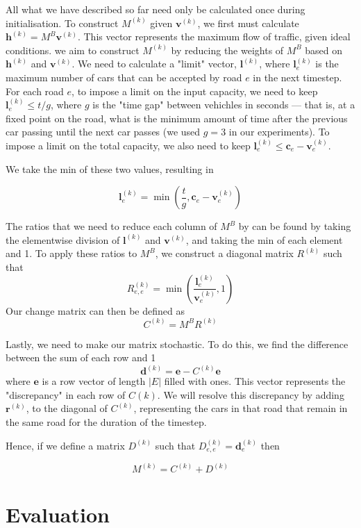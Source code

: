 \documentclass[a4paper]{article}
\begin{document}
All what we have described so far need only be calculated once during initialisation. To construct $M^{(k)}$ given $\mathbf{v}^{(k)}$, we first must calculate
$\mathbf{h}^{(k)} = M^B \mathbf{v}^{(k)}$. This vector represents the maximum flow of traffic, given ideal conditions.
we aim to construct $M^{(k)}$ by reducing the weights of $M^B$ based on $\mathbf{h}^{(k)}$ and $\mathbf{v}^{(k)}$. We need to calculate a "limit" vector, $\mathbf{l}^{(k)}$, where
$\mathbf{l}^{(k)}_e$ is the maximum number of cars that can be accepted by road $e$ in the next timestep.
For each road $e$, to impose a limit on the input capacity, we need to keep $\mathbf{l}^{(k)}_e \leq t/g$,
where $g$ is the "time gap" between vehichles in seconds --- that is, at a fixed point on the road, what is the minimum amount of time after the previous car passing until the next car passes (we used $g = 3$ in our experiments).
To impose a limit on the total capacity, we also need to keep $\mathbf{l}^{(k)}_e \leq \mathbf{c}_e - \mathbf{v}^{(k)}_e$.

We take the min of these two values, resulting in

$$\mathbf{l}^{(k)}_e = \min \left(\frac{t}{g}, \mathbf{c}_e - \mathbf{v}^{(k)}_e \right)$$

The ratios that we need to reduce each column of $M^B$ by can be found by taking the elementwise division of $\mathbf{l}^{(k)}$ and $\mathbf{v}^{(k)}$,
and taking the min of each element and 1. To apply these ratios to $M^B$, we construct a diagonal matrix $R^{(k)}$ such that 
$$
R^{(k)}_{e, e} = \min\left(\frac{\mathbf{l}^{(k)}_e}{\mathbf{v}^{(k)}_e}, 1 \right)
$$
Our change matrix can then be defined as
$$
C^{(k)} = M^B R^{(k)}
$$

Lastly, we need to make our matrix stochastic. To do this, we find the difference between the sum of each row and 1
$$
\mathbf{d}^{(k)} = \mathbf{e} - C^{(k)} \mathbf{e}
$$
where $\mathbf{e}$ is a row vector of length $|E|$ filled with ones.
This vector represents the "discrepancy" in each row of $C{(k)}$. We will resolve this discrepancy by adding $\mathbf{r}^{(k)}$, to the diagonal of $C^{(k)}$, representing
the cars in that road that remain in the same road for the duration of the timestep.

Hence, if we define a matrix $D^{(k)}$ such that $ D^{(k)}_{e, e} = \mathbf{d}^{(k)}_e $ then

$$M^{(k)} = C^{(k)} + D^{(k)}$$

\section{Evaluation}
\end{document}
